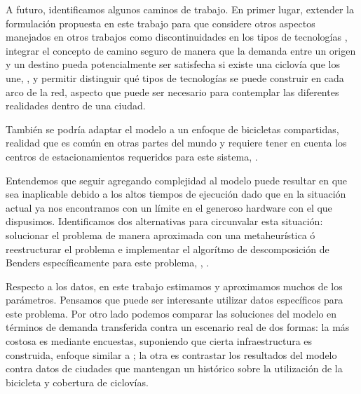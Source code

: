 A futuro, identificamos algunos caminos de trabajo. En primer lugar, extender la formulación propuesta en este trabajo para que considere otros aspectos manejados en otros trabajos como discontinuidades en los tipos de tecnologías \cite{baya2021}, integrar el concepto de camino seguro de manera que la demanda entre un origen y un destino pueda potencialmente ser satisfecha si existe una ciclovía que los une, \cite{Duthie2014}, y permitir distinguir qué tipos de tecnologías se puede construir en cada arco de la red, aspecto que puede ser necesario para contemplar las diferentes realidades dentro de una ciudad.

También se podría adaptar el modelo a un enfoque de bicicletas compartidas, realidad que es común en otras partes del mundo y requiere tener en cuenta los centros de estacionamientos requeridos para este sistema, \cite{vogel2016}.

Entendemos que seguir agregando complejidad al modelo puede resultar en que sea inaplicable debido a los altos tiempos de ejecución dado que en la situación actual ya nos encontramos con un límite en el generoso hardware con el que dispusimos. Identificamos dos alternativas para circunvalar esta situación: solucionar el problema de manera aproximada con una metaheurística ó reestructurar el problema e implementar el algorítmo de descomposición de Benders específicamente para este problema, \cite{bucarey2022}, \cite{Crainic2021}.

Respecto a los datos, en este trabajo estimamos y aproximamos muchos de los parámetros. Pensamos que puede ser interesante utilizar datos específicos para este problema. Por otro lado podemos comparar las soluciones del modelo en términos de demanda transferida contra un escenario real de dos formas: la más costosa es mediante encuestas, suponiendo que cierta infraestructura es construida, enfoque similar a \cite{shwe2014}; la otra es contrastar los resultados del modelo contra datos de ciudades que mantengan un histórico sobre la utilización de la bicicleta y cobertura de ciclovías.
